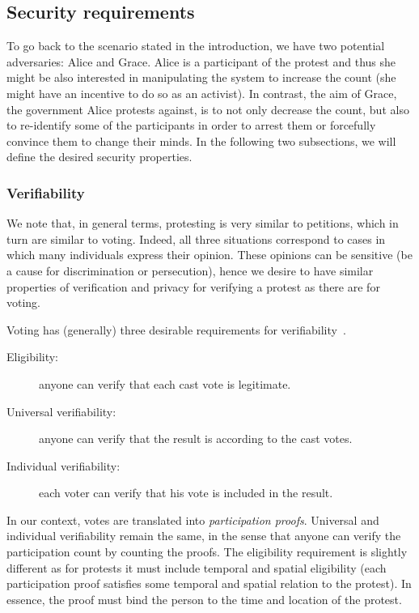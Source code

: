 \subsection{Security requirements}%
\label{Properties}


To go back to the scenario stated in the introduction, we have two potential adversaries: Alice and Grace.
Alice is a participant of the protest and thus she might be also interested in manipulating the system to increase the count (\eg she might have an incentive to do so as an activist).
In contrast, the aim of Grace, the government Alice protests against, is to not only decrease the count, but also to re-identify some of the participants in order to arrest them or forcefully convince them to change their minds.
In the following two subsections, we will define the desired security properties.

\subsubsection{Verifiability}%
\label{Verifiability}

We note that, in general terms, protesting is very similar to petitions, which in turn are similar to voting.
Indeed, all three situations correspond to cases in which many individuals express their opinion.
These opinions can be sensitive (\eg be a cause for discrimination or persecution), hence we desire to have similar properties of verification and privacy for verifying a protest as there are for voting.

Voting has (generally) three desirable requirements for verifiability~\cite{VerifyingPrivacyPropertiesOfVotingProtocols}.
\begin{description}
  \item[Eligibility:] anyone can verify that each cast vote is legitimate.
  \item[Universal verifiability:] anyone can verify that the result is according to the cast votes.
  \item[Individual verifiability:] each voter can verify that his vote is included in the result.
\end{description}
In our context, votes are translated into \emph{participation proofs}.
Universal and individual verifiability remain the same, in the sense that anyone can verify the participation count by counting the proofs.
The eligibility requirement is slightly different as for protests it must include temporal and spatial eligibility (\ie each participation proof satisfies some temporal and spatial relation to the protest).
In essence, the proof must bind the person to the time and location of the protest.

